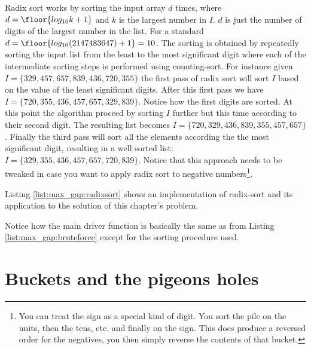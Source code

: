 Radix sort works by sorting the input array $d$ times, where $d = \floor{log_{10}k+1}$ and $k$ is the largest number in $I$.
$d$ is just the number of digits of the largest number in the list. For a standard  $d=\floor{log_{10}(2147483647) + 1}=10$.
The sorting is obtained by repeatedly sorting the input list from the least to the most significant digit where each of the intermediate 
sorting steps is performed using counting-sort.
For instance given $I = \{329,457,657,839,436,720,355\}$ the first pass of radix sort will sort $I$ based on the value of the least significant digits.
After this first pass we have $I=\{720,355,436,457,657,329,839\}$. Notice how the first digits are sorted. At this point the algorithm proceed by sorting 
$I$ further but this time according to their second digit. The resulting list becomes $I=\{720,329,436,839,355,457,657\}$.
Finally the third pass will sort all the elements according the the most significant digit, resulting in a well
sorted list: $I=\{329,355,436,457,657,720,839\}$. 
Notice that this approach needs to be tweaked in case you want to apply radix sort to negative numbers\footnote{You can treat the sign as a special kind of digit. 
You sort the pile on the units, then the tens, etc. and finally on the sign. 
This does produce a reversed order for the negatives, 
you then simply reverse the contents of that bucket.}.

Listing \ref{list:max_gap:radixsort} shows an implementation of radix-sort and its application to the solution of this chapter's problem.

Notice how the main driver function  is basically the same as  from Listing \ref{list:max_gap:bruteforce} except for the sorting procedure used.

\section{Buckets and the pigeons holes}
\label{max_gap:sec:buckets}